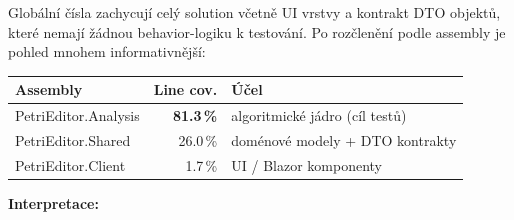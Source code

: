 \documentclass[12pt,a4paper]{article}
\begin{document}
Globální čísla zachycují celý solution včetně UI vrstvy a kontrakt
DTO objektů, které nemají žádnou behavior-logiku k testování.
Po rozčlenění podle assembly je pohled mnohem informativnější:

\begin{longtable}{@{}p{5.5cm}rl@{}}
    \toprule
    \textbf{Assembly} & \textbf{Line cov.} & \textbf{Účel} \\
    \midrule
    \endhead
    PetriEditor.Analysis  & \textbf{81.3\,\%} & algoritmické jádro (cíl testů) \\
    PetriEditor.Shared    & 26.0\,\%          & doménové modely + DTO kontrakty \\
    PetriEditor.Client    & \phantom{0}1.7\,\% & UI / Blazor komponenty \\
    \bottomrule
\end{longtable}

\textbf{Interpretace:}
\end{document}
